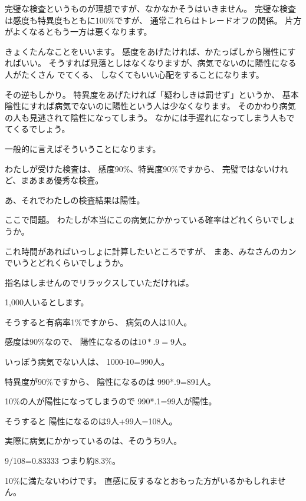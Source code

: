 \documentclass[uplatex,jis2004,dvipdfmx,12pt]{jsarticle}
\begin{document}
完璧な検査というものが理想ですが、なかなかそうはいきません。
完璧な検査は感度も特異度もともに100\%ですが、
通常これらはトレードオフの関係。
片方がよくなるともう一方は悪くなります。

きょくたんなことをいいます。
感度をあげたければ、かたっぱしから陽性にすればいい。
そうすれば見落としはなくなりますが、病気でないのに陽性になる人がたくさん
でてくる、
しなくてもいい心配をすることになります。

その逆もしかり。
特異度をあげたければ「疑わしきは罰せず」というか、
基本陰性にすれば病気でないのに陽性という人は少なくなります。
そのかわり病気の人も見逃されて陰性になってしまう。
なかには手遅れになってしまう人もでてくるでしょう。

一般的に言えばそういうことになります。

わたしが受けた検査は、
感度90\%、特異度90\%ですから、
完璧ではないけれど、まあまあ優秀な検査。

あ、それでわたしの検査結果は陽性。

ここで問題。
わたしが本当にこの病気にかかっている確率はどれくらいでしょうか。

これ時間があればいっしょに計算したいところですが、
まあ、みなさんのカンでいうとどれくらいでしょうか。

指名はしませんのでリラックスしていただければ。

1,000人いるとします。

そうすると有病率1\%ですから、
病気の人は10人。


感度は90\%なので、
陽性になるのは$10*.9=9$人。


いっぽう病気でない人は、
1000-10=990人。

特異度が90\%ですから、
陰性になるのは
990*.9=891人。

10\%の人が陽性になってしまうので
990*.1=99人が陽性。

そうすると
陽性になるのは9人+99人=108人。

実際に病気にかかっているのは、そのうち9人。

9/108=0.83333
つまり約8.3\%。

10\%に満たないわけです。
直感に反するなとおもった方がいるかもしれません。


\bigskip


\end{document}
